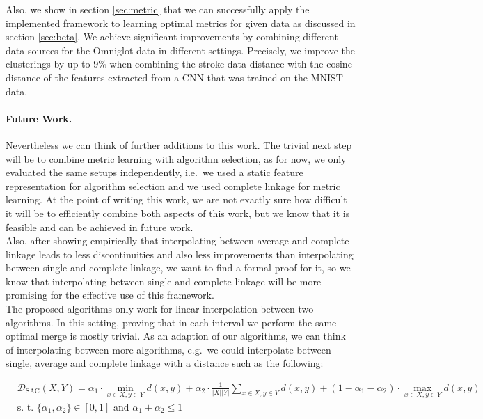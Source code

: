 Also, we show in section \ref{sec:metric} that we can successfully apply the implemented framework to learning optimal metrics for given data as discussed in section \ref{sec:beta}. We achieve significant improvements by combining different data sources for the Omniglot data in different settings. Precisely, we improve the clusterings by up to $9\%$ when combining the stroke data distance with the cosine distance of the features extracted from a CNN that was trained on the MNIST data.

\paragraph{Future Work.} Nevertheless we can think of further additions to this work. The trivial next step will be to combine metric learning with algorithm selection, as for now, we only evaluated the same setups independently, i.e.\ we used a static feature representation for algorithm selection and we used complete linkage for metric learning. At the point of writing this work, we are not exactly sure how difficult it will be to efficiently combine both aspects of this work, but we know that it is feasible and can be achieved in future work.\\

Also, after showing empirically that interpolating between average and complete linkage leads to less discontinuities and also less improvements than interpolating between single and complete linkage, we want to find a formal proof for it, so we know that interpolating between single and complete linkage will be more promising for the effective use of this framework.\\ 

The proposed algorithms only work for linear interpolation between two algorithms. In this setting, proving that in each interval we perform the same optimal merge is mostly trivial. As an adaption of our algorithms, we can think of interpolating between more algorithms, e.g.\ we could interpolate between single, average and complete linkage with a distance such as the following:

\begin{align*}
&\mathcal{D}_\text{SAC}(X,Y) = \alpha_1 \cdot \min\limits_{x \in X, y \in Y} d(x,y) + \alpha_2 \cdot \frac{1}{|X||Y|} \sum\limits_{x \in X, y \in Y} d(x,y) + (1-\alpha_1-\alpha_2) \cdot \max\limits_{x \in X, y \in Y} d(x,y)\\
&\text{s. t. } \{\alpha_1, \alpha_2\} \in [0,1] \text{ and } \alpha_1 + \alpha_2 \le 1
\end{align*}


